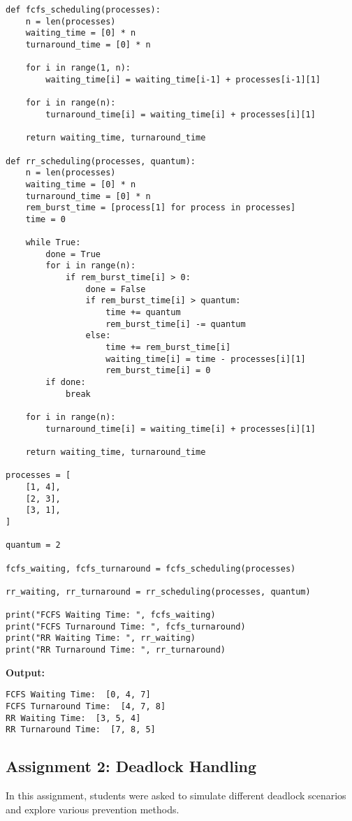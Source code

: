 \documentclass[12pt]{article}
\begin{document}
\begin{verbatim}
def fcfs_scheduling(processes):
    n = len(processes)
    waiting_time = [0] * n
    turnaround_time = [0] * n

    for i in range(1, n):
        waiting_time[i] = waiting_time[i-1] + processes[i-1][1]

    for i in range(n):
        turnaround_time[i] = waiting_time[i] + processes[i][1]

    return waiting_time, turnaround_time

def rr_scheduling(processes, quantum):
    n = len(processes)
    waiting_time = [0] * n
    turnaround_time = [0] * n
    rem_burst_time = [process[1] for process in processes]
    time = 0

    while True:
        done = True
        for i in range(n):
            if rem_burst_time[i] > 0:
                done = False
                if rem_burst_time[i] > quantum:
                    time += quantum
                    rem_burst_time[i] -= quantum
                else:
                    time += rem_burst_time[i]
                    waiting_time[i] = time - processes[i][1]
                    rem_burst_time[i] = 0
        if done:
            break

    for i in range(n):
        turnaround_time[i] = waiting_time[i] + processes[i][1]

    return waiting_time, turnaround_time

processes = [
    [1, 4],  
    [2, 3],  
    [3, 1],  
]

quantum = 2

fcfs_waiting, fcfs_turnaround = fcfs_scheduling(processes)

rr_waiting, rr_turnaround = rr_scheduling(processes, quantum)

print("FCFS Waiting Time: ", fcfs_waiting)
print("FCFS Turnaround Time: ", fcfs_turnaround)
print("RR Waiting Time: ", rr_waiting)
print("RR Turnaround Time: ", rr_turnaround)

\end{verbatim}
\textbf{Output: }
\begin{verbatim}
FCFS Waiting Time:  [0, 4, 7]
FCFS Turnaround Time:  [4, 7, 8]
RR Waiting Time:  [3, 5, 4]
RR Turnaround Time:  [7, 8, 5]
\end{verbatim}


\subsection{Assignment 2: Deadlock Handling}
In this assignment, students were asked to simulate different deadlock scenarios and explore various prevention methods.
\end{document}
